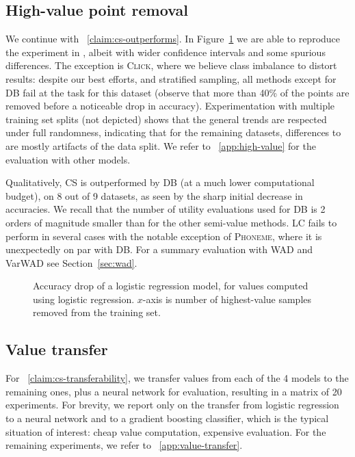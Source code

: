\documentclass[10pt]{article}
\newcommand{\tmname}[1]{\textsc{#1}}
\begin{document}
\subsection{High-value point removal}\label{sec:high-value}

We continue with ~\ref{claim:cs-outperforms}. In  Figure~\ref{fig:acc-lr-lr}
we are able to reproduce the experiment in {\cite{schoch_csshapley_2022}},
albeit with wider confidence intervals and some spurious differences. The
exception is {\tmname{Click}}, where we believe class imbalance to distort
results: despite our best efforts, and stratified sampling, all methods except
for DB fail at the task for this dataset (observe that more than 40\% of the
points are removed before a noticeable drop in accuracy). Experimentation with
multiple training set splits (not depicted) shows that the general trends are
respected under full randomness, indicating that for the remaining datasets,
differences to {\cite{schoch_csshapley_2022}} are mostly artifacts of the
data split. We refer to ~\ref{app:high-value} for the evaluation with other
models.

Qualitatively, CS is outperformed by DB (at a much lower computational
budget), on 8 out of 9 datasets, as seen by the sharp initial decrease in
accuracies. We recall that the number of utility evaluations used for DB is 2
orders of magnitude smaller than for the other semi-value methods. LC fails to
perform in several cases with the notable exception of {\tmname{Phoneme}},
where it is unexpectedly on par with DB. For a summary evaluation with WAD and
VarWAD see  Section~\ref{sec:wad}.

\begin{figure}[h]
  \caption{\label{fig:acc-lr-lr}Accuracy drop of a logistic regression model,
  for values computed using logistic regression. $x$-axis is number of
  highest-value samples removed from the training set.}
\end{figure}

\subsection{Value transfer}\label{sec:value-transfer}

For ~\ref{claim:cs-transferability}, we transfer values from each of the 4
models to the remaining ones, plus a neural network for evaluation, resulting
in a matrix of 20 experiments. For brevity, we report only on the transfer
from logistic regression to a neural network and to a gradient boosting
classifier, which is the typical situation of interest: cheap value
computation, expensive evaluation. For the remaining experiments, we refer to
~\ref{app:value-transfer}.
\end{document}
